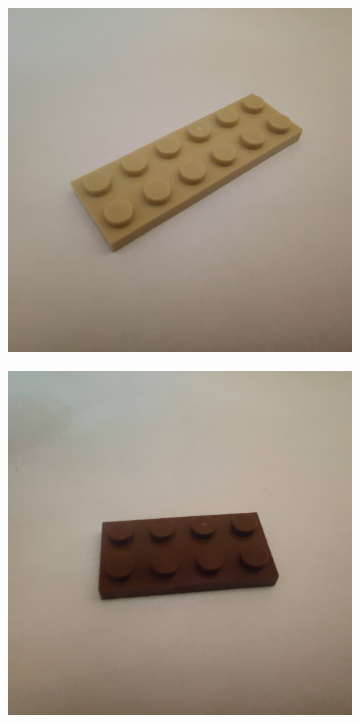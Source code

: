 \documentclass[]{article}
\begin{document}
\begin{figure}[h]
    \centering
    \begin{subfigure}[b]{0.2\textwidth}
        \includegraphics[width=\textwidth]{photographed images/1.jpg}
    \end{subfigure}
    \begin{subfigure}[b]{0.2\textwidth}
        \includegraphics[width=\textwidth]{photographed images/2.jpg}

\end{subfigure}
\end{figure}
\end{document}
